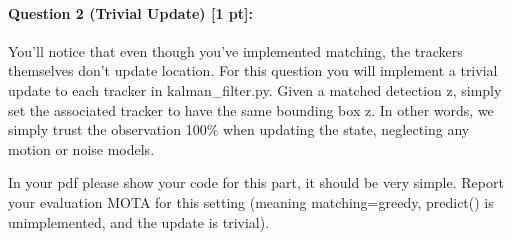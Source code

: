 \documentclass[11pt]{article}
\begin{document}
\paragraph{Question 2 (Trivial Update) [1 pt]:}
You'll notice that even though you've implemented matching, the trackers themselves don't update location. For this question you will implement a trivial update to each tracker in kalman\_filter.py. Given a matched detection z, simply set the associated tracker to have the same bounding box z. In other words, we simply trust the observation 100\% when updating the state, neglecting any motion or noise models.

In your pdf please show your code for this part, it should be very simple. Report your evaluation MOTA for this setting (meaning matching=greedy, predict() is unimplemented, and the update is trivial).
\end{document}
